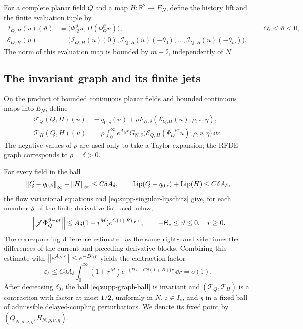 For a complete planar field \(Q\) and a map \(H:\mathbb R^2\to E_N\),
define the history lift and the finite evaluation tuple by
\begin{align}
 \mathcal I_{Q,H}(u)(\vartheta)
 &=\bigl(\Phi_Q^\vartheta u,H(\Phi_Q^\vartheta u)\bigr),
 &&-\Theta_*\le\vartheta\le0,
 \label{eq:supp-history-lift}\\
 \mathcal E_{Q,H}(u)
 &=\bigl(\mathcal I_{Q,H}(u)(0),
          \mathcal I_{Q,H}(u)(-\theta_0),\ldots,
          \mathcal I_{Q,H}(u)(-\theta_m)\bigr).
 \label{eq:supp-history-evaluation}
\end{align}
The norm of this evaluation map is bounded by \(m+2\), independently of
\(N\).

\subsection{The invariant graph and its finite jets}

On the product of bounded continuous planar fields and bounded continuous
maps into \(E_N\), define
\begin{align}
 \mathcal T_Q(Q,H)(u)
 &=q_{0,\delta}(u)+\rho F_{N,\delta}
       (\mathcal E_{Q,H}(u);\rho,\nu,\eta),
 \label{eq:supp-graph-transform-Q}\\
 \mathcal T_H(Q,H)(u)
 &=\rho\int_0^\infty e^{A_Nr}G_{N,\delta}
       \bigl(\mathcal E_{Q,H}(\Phi_Q^{-\rho r}u);
              \rho,\nu,\eta\bigr)\,\dd r.
 \label{eq:supp-graph-transform-H}
\end{align}
The negative values of \(\rho\) are used only to take a Taylor expansion;
the RFDE graph corresponds to \(\rho=\delta>0\).

For every field in the ball
\begin{equation}
 \left\lVert Q-q_{0,\delta}\right\rVert_\infty+\left\lVert H\right\rVert_\infty
 \le C\delta A_\delta,\qquad
 \operatorname{Lip}(Q-q_{0,\delta})+\operatorname{Lip}(H)
 \le C\delta A_\delta,
 \label{eq:supp-graph-ball}
\end{equation}
the flow variational equations and \eqref{eq:supp-singular-lipschitz} give,
for each member \(\mathscr J\) of the finite derivative list used below,
\begin{equation}
 \left\lVert\mathscr J\Phi_Q^{\vartheta-\rho r}\right\rVert
 \le A_\delta(1+r^M)e^{C(1+R)\left\lvert\rho\right\rvert r},
 \qquad -\Theta_*\le\vartheta\le0,\quad r\ge0.
 \label{eq:supp-flow-jet-bound}
\end{equation}
The corresponding difference estimate has the same right-hand side times
the differences of the current and preceding derivative blocks.  Combining
this estimate with
\(\left\lVert e^{A_Nr}\right\rVert\le e^{-D\gamma r}\) yields the contraction factor
\begin{equation}
 \varepsilon_\delta
 \le C\delta A_\delta
   \int_0^\infty(1+r^M)
      e^{-\{D\gamma-C\delta(1+R)\}r}\,\dd r=o(1).
 \label{eq:supp-graph-contraction}
\end{equation}
After decreasing \(\delta_0\), the ball
\eqref{eq:supp-graph-ball} is invariant and
\((\mathcal T_Q,\mathcal T_H)\) is a contraction with factor at most
\(1/2\), uniformly in \(N\), \(\nu\in I_\nu\), and \(\eta\) in a fixed ball
of admissible delayed-coupling perturbations.  We denote its fixed point by
\((Q_{N,\rho,\nu,\eta},H_{N,\rho,\nu,\eta})\).

